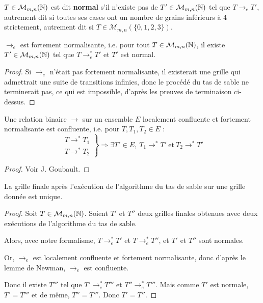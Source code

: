 $T\in\mathcal{M}_{m,n}(\mathbb{N})$ est dit \textbf{normal} s'il n'existe pas de $T'\in\mathcal{M}_{m,n}(\mathbb{N})$ tel que $T\rightarrow_eT'$, autrement dit si toutes ses cases ont un nombre de grains inférieurs à 4 strictement, autrement dit si $T\in\mathcal{M}_{m,n}(\{0,1,2,3\})$.

\begin{lem}
$\rightarrow_e$ est fortement normalisante, i.e. pour tout $T\in\mathcal{M}_{m,n}(\mathbb{N})$, il existe $T'\in\mathcal{M}_{m,n}(\mathbb{N})$ tel que $T\rightarrow_e^*T'$ et $T'$ est normal.
\end{lem}
\begin{proof}
Si $\rightarrow_e$ n'était pas fortement normalisante, il existerait une grille qui admettrait une suite de transitions infinies, donc le procédé du tas de sable ne terminerait pas, ce qui est impossible, d'après les preuves de terminaison ci-dessus.
\end{proof}

\begin{lem} 
Une relation binaire $\rightarrow$ sur un ensemble $E$ localement confluente et fortement normalisante est confluente, i.e. pour $T, T_1, T_2\in E$ : 
$$\left.\begin{array}{ll}T\rightarrow^*T_1\\T\rightarrow^*T_2\end{array}\right\}\Rightarrow \exists T'\in E,\ T_1\rightarrow^*T' \mathrm{\ et\ }T_2\rightarrow^*T'$$
\end{lem}
\begin{proof}
Voir J. Goubault.
\end{proof}

\begin{theo}
La grille finale après l'exécution de l'algorithme du tas de sable sur une grille donnée est unique.
\end{theo}
\begin{proof}
Soit $T\in\mathcal{M}_{m,n}(\mathbb{N})$. Soient $T'$ et $T''$ deux grilles finales obtenues avec deux exécutions de l'algorithme du tas de sable.

Alors, avec notre formalisme, $T\rightarrow_e^*T'$ et $T\rightarrow_e^*T''$, et $T'$ et $T''$ sont normales.

Or, $\rightarrow_e$ est localement confluente et fortement normalisante, donc d'après le lemme de Newman, $\rightarrow_e$ est confluente.

Donc il existe $T'''$ tel que $T'\rightarrow_e^*T'''$ et  $T''\rightarrow_e^*T'''$. Mais comme $T'$ est normale, $T'=T'''$ et de même, $T''=T'''$. Donc $T'=T''$.

\end{proof}

